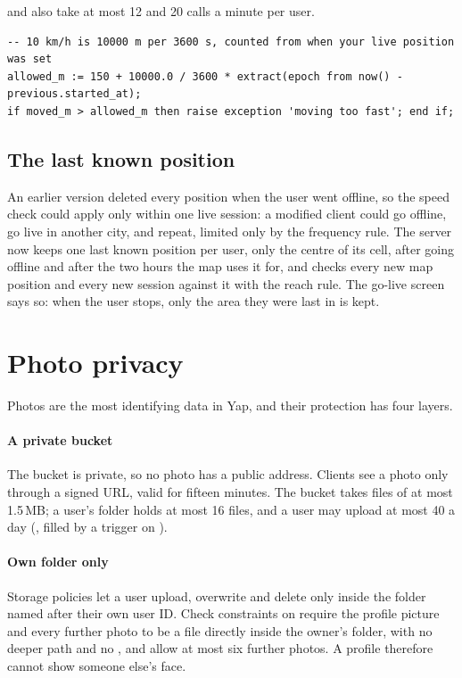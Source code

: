  and  also take at most 12 and 20 calls a minute per user.

\begin{lstlisting}[language=pgsql, caption={The speed check in \code{go_green}. \code{moved_m} is the distance from the stored position.}, label={lst:speed}]
-- 10 km/h is 10000 m per 3600 s, counted from when your live position was set
allowed_m := 150 + 10000.0 / 3600 * extract(epoch from now() - previous.started_at);
if moved_m > allowed_m then raise exception 'moving too fast'; end if;
\end{lstlisting}

\subsection{The last known position}
\label{sec:trade-off}

An earlier version deleted every position when the user went offline, so the speed check could apply
only within one live session: a modified client could go offline, go live in another city, and repeat,
limited only by the frequency rule. The server now keeps one last known position per user, only the
centre of its cell, after going offline and after the two hours the map uses it for, and checks every new
map position and every new session against it with the reach rule. The go-live screen says so: when the
user stops, only the area they were last in is kept.

\section{Photo privacy}
\label{sec:photo-privacy}

Photos are the most identifying data in Yap, and their protection has four layers.

\paragraph{A private bucket} The  bucket is private, so no photo has a public address.
Clients see a photo only through a signed URL, valid for fifteen minutes. The bucket takes files of at
most 1.5\,MB; a user's folder holds at most 16 files, and a user may upload at most 40 a day
(, filled by a trigger on ).

\paragraph{Own folder only} Storage policies let a user upload, overwrite and delete only inside the
folder named after their own user ID. Check constraints on  require the profile picture and
every further photo to be a file directly inside the owner's folder, with no deeper path and no
, and allow at most six further photos. A profile therefore cannot show someone else's face.

